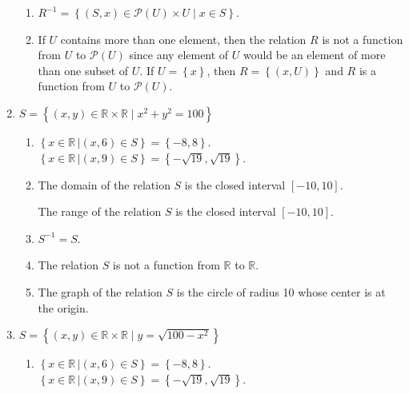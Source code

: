 \begin{enumerate}
\begin{enumerate}
\item $R^{-1} = \left\{ \left(S, x \right) \in \mathcal{P} \left( U \right) \times U 
\mid x \in S \right\}$.

\item If $U$ contains more than one element, then the relation $R$ is not a function from $U$ to $\mathcal{P} \left( U \right)$ since any element of $U$ would be an element of more than one subset of $U$.  If $U = \left\{ x \right\}$, then $R = \left\{ \left( x, U \right) \right\}$ and $R$ is a function from $U$ to $\mathcal{P} \left( U \right)$.
\end{enumerate}



\item $S = \left\{ {\left( {x, y} \right) \in \mathbb{R} \times \mathbb{R} \mid x^2  + y^2  = 100} \right\}$
\begin{enumerate}
\item $\left\{ {\left. {x \in \mathbb{R}\,} \right| \left( {x, 6} \right) \in S} \right\} = \left\{ { - 8, 8} \right\}$. \\ $\left\{ {\left. {x \in \mathbb{R}\,} \right| \left( {x, 9} \right) \in S} \right\} = \left\{ { - \sqrt {19} , \sqrt {19} } \right\}$.

\item The domain of the relation $S$ is the closed interval $\left[ -10, 10 \right]$.

The range of the relation $S$ is the closed interval $\left[ -10, 10 \right]$.

\item $S^{-1} = S$.

\item The relation $S$ is not a function from $\mathbb{R}$ to $\mathbb{R}$.

\item The graph of the relation $S$ is the circle of radius 10 whose center is at the origin.
\end{enumerate}



\item $S = \left\{ {\left( {x, y} \right) \in \mathbb{R} \times \mathbb{R}   \mid y = \sqrt {100 - x^2 } } \right\}$
\begin{enumerate}
\item $\left\{ {\left. {x \in \mathbb{R}\,} \right| \left( {x, 6} \right) \in S} \right\} = \left\{ { - 8, 8} \right\}$. \\ $\left\{ {\left. {x \in \mathbb{R}\,} \right| \left( {x, 9} \right) \in S} \right\} = \left\{ { - \sqrt {19} , \sqrt {19} } \right\}$.


\end{enumerate}
\end{enumerate}
